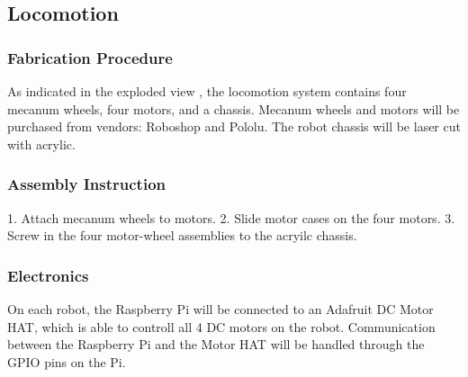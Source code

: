 
\subsection{Locomotion}
\label{sec:hardware_locomotion}

\subsubsection{Fabrication Procedure}
\label{sec:locomotion_fab}
As indicated in the exploded view , the locomotion system contains four mecanum wheels, four motors, and a chassis. Mecanum wheels and motors will be purchased from vendors: Roboshop and Pololu. The robot chassis will be laser cut with acrylic.

\subsubsection{Assembly Instruction}
\label{sec:locomotion_assemb}
1. Attach mecanum wheels to motors.
2. Slide motor cases on the four motors. 
3. Screw in the four motor-wheel assemblies to the acryilc chassis.

\subsubsection{Electronics}
\label{sec:locomotion_electronics}
On each robot, the Raspberry Pi will be connected to an Adafruit DC Motor HAT, which is able to controll all 4 DC motors on the robot. Communication between the Raspberry Pi and the Motor HAT will be handled through the GPIO pins on the Pi. 